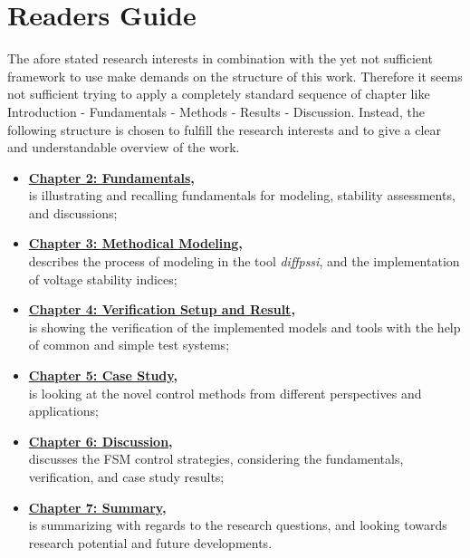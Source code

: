 \section{Readers Guide}

The afore stated research interests in combination with the yet not sufficient framework to use make demands on the structure of this work. 
Therefore it seems not sufficient trying to apply a completely standard sequence of chapter like \glqq Introduction - Fundamentals - Methods - Results - Discussion\grqq.
Instead, the following structure is chosen to fulfill the research interests and to give a clear and understandable overview of the work.
\begin{itemize}
    \item \textbf{\hyperref[chap:fundamentals]{Chapter 2: Fundamentals},}\\
    is illustrating and recalling fundamentals for modeling, stability assessments, and discussions;
    \item \textbf{\hyperref[chap:methodical-modeling]{Chapter 3: Methodical Modeling},}\\
    describes the process of modeling in the tool \textit{diffpssi}, and the implementation of voltage stability indices;
    \item \textbf{\hyperref[chap:verification]{Chapter 4: Verification Setup and Result},}\\
    is showing the verification of the implemented models and tools with the help of common and simple test systems;
    \item \textbf{\hyperref[chap:case-study]{Chapter 5: Case Study},}\\
    is looking at the novel control methods from different perspectives and applications; 
    \item \textbf{\hyperref[chap:discussion]{Chapter 6: Discussion},}\\
    discusses the FSM control strategies, considering the fundamentals, verification, and case study results;
    \item \textbf{\hyperref[chap:summary]{Chapter 7: Summary},}\\
    is summarizing with regards to the research questions, and looking towards research potential and future developments. 
\end{itemize}


